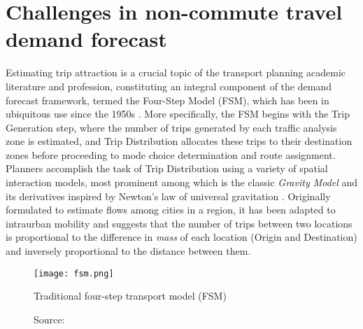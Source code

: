 \section{Challenges in non-commute travel demand forecast}

Estimating trip attraction is a crucial topic of the transport planning academic literature and profession, constituting an integral component of the demand forecast framework, termed the Four-Step Model (FSM), which has been in ubiquitous use since the 1950s \citep{TravelForecastingResource}. More specifically, the FSM begins with the Trip Generation step, where the number of trips generated by each traffic analysis zone is estimated, and Trip Distribution allocates these trips to their destination zones before proceeding to mode choice determination and route assignment. Planners accomplish the task of Trip Distribution using a variety of spatial interaction models, most prominent among which is the classic \textit{Gravity Model} and its derivatives inspired by Newton's law of universal gravitation \citep{erlanderGravityModelTransportation1990}. Originally formulated to estimate flows among cities in a region, it has been adapted to intraurban mobility and suggests that the number of trips between two locations is proportional to the difference in \textit{mass} of each location (Origin and Destination) and inversely proportional to the distance between them. 

\begin{figure}[h]
    \centering
    \texttt{[image: fsm.png]}
    \caption{Traditional four-step transport model (FSM)}
    \captionsetup{aboveskip=0pt,font=it}
    \caption*{Source: \cite{evansClothingEmperorTransport2007}}
    \label{fig:fsm}
\end{figure}

